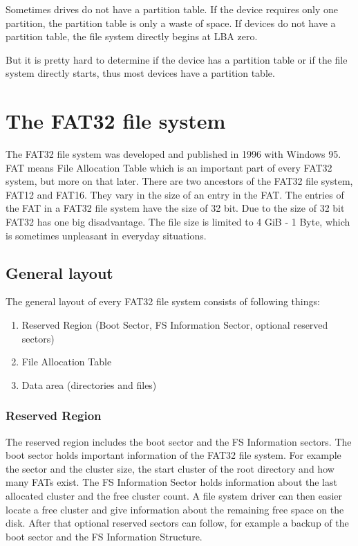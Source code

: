 Sometimes drives do not have a partition table. If the device requires only one partition, the partition table is only a waste of space. If devices do not have a partition table, the file system directly begins at LBA zero.

But it is pretty hard to determine if the device has a partition table or if the file system directly starts, thus most devices have a partition table. 

\section{The FAT32 file system}

The FAT32 file system was developed and published in 1996 with Windows 95. FAT means File Allocation Table which is an important part of every FAT32 system, but more on that later. There are two ancestors of the FAT32 file system, FAT12 and FAT16. They vary in the size of an entry in the FAT. The entries of the FAT in a FAT32 file system have the size of 32 bit. Due to the size of 32 bit FAT32 has one big disadvantage. The file size is limited to 4 GiB - 1 Byte, which is sometimes unpleasant in everyday situations\cite{wiki_fat}.

\subsection{General layout}

The general layout of every FAT32 file system consists of following things\cite{fatgen103, wiki_fat}:

\begin{enumerate}
\item Reserved Region (Boot Sector, FS Information Sector, optional reserved sectors)
\item File Allocation Table
\item Data area (directories and files)
\end{enumerate}

\subsubsection{Reserved Region}

The reserved region includes the boot sector and the FS Information sectors. The boot sector holds important information of the FAT32 file system. For example the sector and the cluster size, the start cluster of the root directory and how many FATs exist. The FS Information Sector holds information about the last allocated cluster and the free cluster count. A file system driver can then easier locate a free cluster and give information about the remaining free space on the disk. After that optional reserved sectors can follow, for example a backup of the boot sector and the FS Information Structure\cite{usb_ms_jan}.

